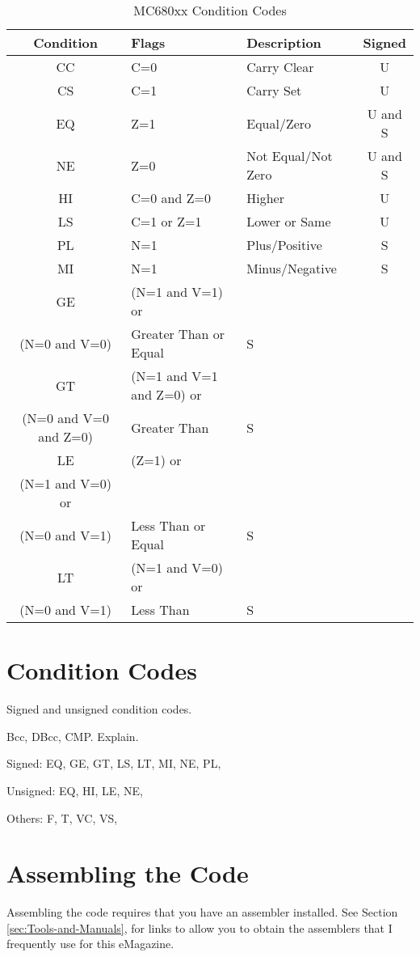 \begin{table}[!h]
\begin{centering}
\begin{tabular}{|c|>{\centering}p{}|>{\centering}p{}|c|}
\hline 
\textbf{Condition} & \textbf{Flags} & \textbf{Description} & \textbf{Signed}\tabularnewline
\hline 
\hline 
CC & C=0 & Carry Clear & U\tabularnewline
\hline 
CS & C=1 & Carry Set & U\tabularnewline
\hline 
EQ & Z=1 & Equal/Zero & U and S\tabularnewline
\hline 
NE & Z=0 & Not Equal/Not Zero & U and S\tabularnewline
\hline 
HI & C=0 and Z=0 & Higher & U\tabularnewline
\hline 
LS & C=1 or Z=1 & Lower or Same & U\tabularnewline
\hline 
PL & N=1 & Plus/Positive & S\tabularnewline
\hline 
MI & N=1 & Minus/Negative & S\tabularnewline
\hline 
GE & (N=1 and V=1) or\\
(N=0 and V=0) & Greater Than or Equal & S\tabularnewline
\hline 
GT & (N=1 and V=1 and Z=0) or \\
(N=0 and V=0 and Z=0) & Greater Than & S\tabularnewline
\hline 
LE & (Z=1) or \\
(N=1 and V=0) or \\
(N=0 and V=1) & Less Than or Equal & S\tabularnewline
\hline 
LT & (N=1 and V=0) or \\
(N=0 and V=1) & Less Than & S\tabularnewline
\hline 
\end{tabular}
\par\end{centering}
\caption{MC680xx Condition Codes\label{tab:MC680xx-Condition-Codes}}
\end{table}


\section{Condition Codes}

Signed and unsigned condition codes.

Bcc, DBcc, CMP. Explain.

Signed: EQ, GE, GT, LS, LT, MI, NE, PL, 

Unsigned: EQ, HI, LE, NE, 

Others: F, T, VC, VS,

\section{Assembling the Code}

Assembling the code requires that you have an assembler installed.
See Section \ref{sec:Tools-and-Manuals}, 
for links to allow you to obtain the assemblers that I frequently
use for this eMagazine.

